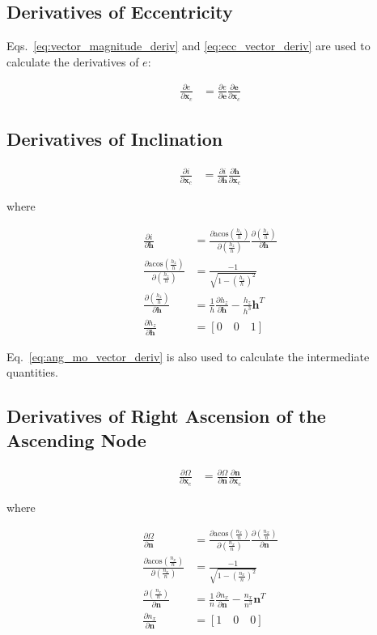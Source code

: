 \documentclass[]{article}
\newcommand{\vb}[1]{\bm{#1}} %
\newcommand{\pd}[2]{\frac{\partial #1}{\partial #2}} %
\newcommand{\xc}[0]{\vb{x}_c}
\begin{document}
\subsection{Derivatives of Eccentricity}

Eqs.~\eqref{eq:vector_magnitude_deriv} and \eqref{eq:ecc_vector_deriv} are used to calculate the derivatives of $e$:

\begin{align}
	\pd{e}{\xc} &= \pd{e}{\vb{e}} \pd{\vb{e}}{\xc}
\end{align}

\subsection{Derivatives of Inclination}

\begin{align}
\label{eq:inc_deriv}
\pd{i}{\xc} &= \pd{i}{\vb{h}} \pd{\vb{h}}{\xc}
\end{align}

\noindent where

\begin{align}
	\pd{i}{\vb{h}} &= \pd{\mathrm{acos} \left( \frac{h_z}{h} \right)}{\left( \frac{h_z}{h} \right)} \pd{\left( \frac{h_z}{h} \right)}{\vb{h}} \\
	\pd{\mathrm{acos} \left( \frac{h_z}{h} \right)}{\left( \frac{h_z}{h} \right)} &= \frac{-1}{\sqrt{1 - \left( \frac{h_z}{h} \right)^2}} \\
	\pd{\left( \frac{h_z}{h} \right)}{\vb{h}} &= \frac{1}{h} \pd{h_z}{\vb{h}} - \frac{h_z}{h^3} \vb{h}^T \\
	\pd{h_z}{\vb{h}} &= \left[ 0 \quad 0 \quad 1 \right]
\end{align}

\noindent Eq.~\eqref{eq:ang_mo_vector_deriv} is also used to calculate the intermediate quantities.

\subsection{Derivatives of Right Ascension of the Ascending Node}

\begin{align}
\label{eq:raan_deriv}
\pd{\Omega}{\xc} &= \pd{\Omega}{\vb{n}} \pd{\vb{n}}{\xc}
\end{align}

\noindent where

\begin{align}
\pd{\Omega}{\vb{n}} &= \pd{\mathrm{acos} \left( \frac{n_x}{n} \right)}{\left( \frac{n_x}{n} \right)} \pd{\left( \frac{n_x}{n} \right)}{\vb{n}} \\
\pd{\mathrm{acos} \left( \frac{n_x}{n} \right)}{\left( \frac{n_x}{n} \right)} &= \frac{-1}{\sqrt{1 - \left( \frac{n_x}{n} \right)^2}} \\
\pd{\left( \frac{n_x}{n} \right)}{\vb{n}} &= \frac{1}{n} \pd{n_x}{\vb{n}} - \frac{n_x}{n^3} \vb{n}^T \\
\pd{n_x}{\vb{n}} &= \left[ 1 \quad 0 \quad 0 \right]
\end{align}
\end{document}
